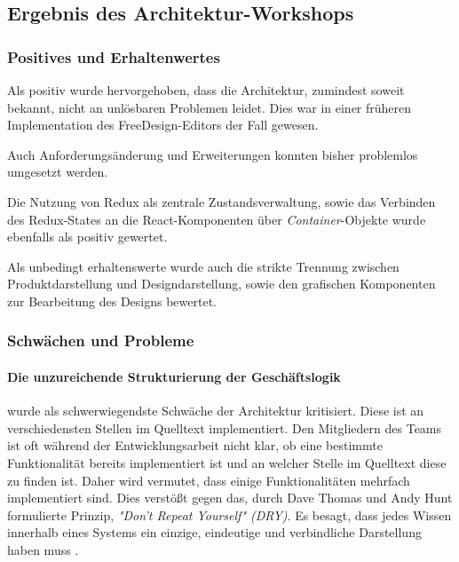 \subsection{Ergebnis des Architektur-Workshops}

\subsubsection{Positives und Erhaltenwertes}
Als positiv wurde hervorgehoben, dass die Architektur, zumindest soweit bekannt, nicht an unlösbaren Problemen leidet. 
Dies war in einer früheren Implementation des FreeDesign-Editors der Fall gewesen.

Auch Anforderungsänderung und Erweiterungen konnten bisher problemlos umgesetzt werden.

Die Nutzung von Redux als zentrale Zustandsverwaltung, sowie das Verbinden des Redux-States an die React-Komponenten über \emph{Container}-Objekte wurde ebenfalls als positiv gewertet. 

Als unbedingt erhaltenswerte wurde auch die strikte Trennung zwischen Produktdarstellung und Designdarstellung, sowie den grafischen Komponenten zur Bearbeitung des Designs bewertet. 


\subsubsection{Schwächen und Probleme}
\paragraph{Die unzureichende Strukturierung der Geschäftslogik}
wurde als schwerwiegendste Schwäche der Architektur kritisiert.
Diese ist an verschiedensten Stellen im Quelltext implementiert. Den Mitgliedern des Teams ist oft während der Entwicklungsarbeit nicht klar, ob eine bestimmte Funktionalität bereits implementiert ist und an welcher Stelle im Quelltext diese zu finden ist. 
Daher wird vermutet, dass einige Funktionalitäten mehrfach implementiert sind. 
Dies verstößt gegen das, durch Dave Thomas und Andy Hunt formulierte Prinzip, \emph{"Don’t Repeat Yourself" (DRY)}. Es besagt, dass jedes Wissen innerhalb eines Systems ein einzige, eindeutige und verbindliche Darstellung haben muss \autocite[vgl.][30 - 31]{ThomasAndHunt2020}. 

